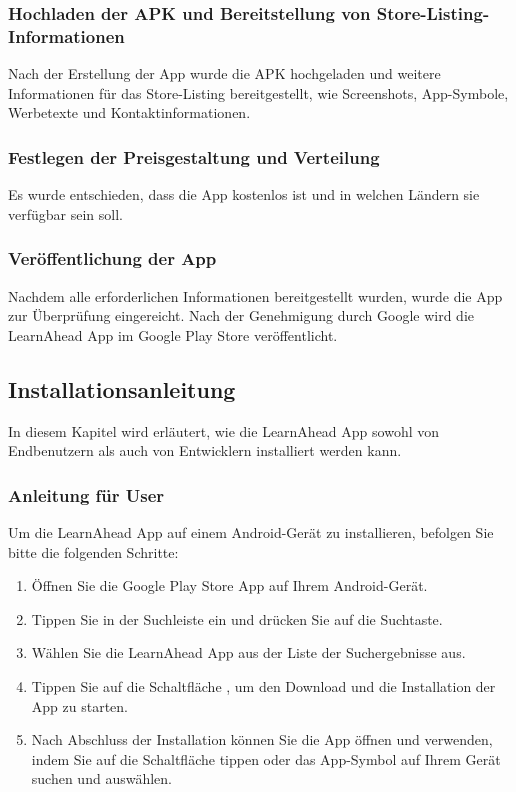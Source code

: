 \subsubsection{Hochladen der APK und Bereitstellung von Store-Listing-Informationen}
Nach der Erstellung der App wurde die APK hochgeladen und weitere Informationen für das Store-Listing bereitgestellt, wie Screenshots, App-Symbole, Werbetexte und Kontaktinformationen.\newline
\subsubsection{Festlegen der Preisgestaltung und Verteilung}
Es wurde entschieden, dass die App kostenlos ist und in welchen Ländern sie verfügbar sein soll.\newline
\subsubsection{Veröffentlichung der App}
Nachdem alle erforderlichen Informationen bereitgestellt wurden, wurde die App zur Überprüfung eingereicht. Nach der Genehmigung durch Google wird die LearnAhead App im Google Play Store veröffentlicht.

\subsection{Installationsanleitung}
In diesem Kapitel wird erläutert, wie die LearnAhead App sowohl von Endbenutzern als auch von Entwicklern installiert werden kann.
\subsubsection{Anleitung für User}
Um die LearnAhead App auf einem Android-Gerät zu installieren, befolgen Sie bitte die folgenden Schritte: \newline
\begin{enumerate}
    \item Öffnen Sie die Google Play Store App auf Ihrem Android-Gerät.
    \item Tippen Sie in der Suchleiste  ein und drücken Sie auf die Suchtaste.
    \item Wählen Sie die LearnAhead App aus der Liste der Suchergebnisse aus.
    \item Tippen Sie auf die Schaltfläche , um den Download und die Installation der App zu starten.
    \item Nach Abschluss der Installation können Sie die App öffnen und verwenden, indem Sie auf die Schaltfläche  tippen oder das App-Symbol auf Ihrem Gerät suchen und auswählen.
\end{enumerate}

